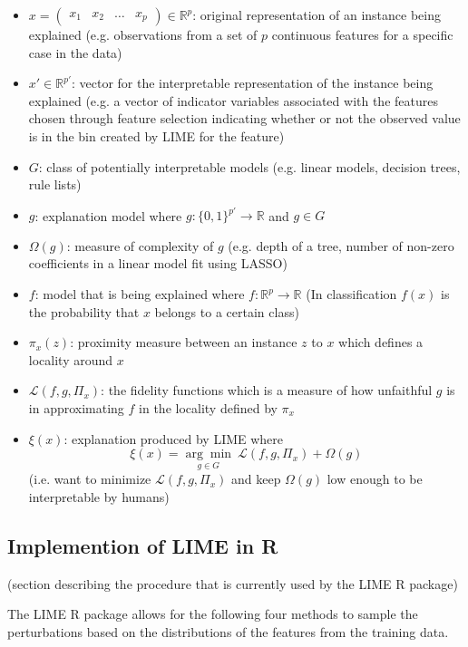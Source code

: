 \documentclass[AMS,STIX2COL]{WileyNJD-v2}
\begin{document}
\begin{itemize}
\item $x=\left(\begin{array}{cccc}x_1 & x_2 & \hdots & x_p\end{array}\right)\in\mathbb{R}^p$: original representation of an instance being explained (e.g. observations from a set of $p$ continuous features for a specific case in the data) %
\item $x'\in\mathbb{R}^{p'}$: vector for the interpretable representation of the instance being explained (e.g. a vector of indicator variables associated with the features chosen through feature selection indicating whether or not the observed value is in the bin created by LIME for the feature)
\item $G$: class of potentially interpretable models (e.g. linear models, decision trees, rule lists)
\item $g$: explanation model where $g:\{0,1\}^{p'}\rightarrow\mathbb{R}$ and $g\in G$
\item $\Omega(g)$: measure of complexity of $g$ (e.g. depth of a tree, number of non-zero coefficients in a linear model fit using LASSO)
\item $f$: model that is being explained where $f:\mathbb{R}^p\rightarrow\mathbb{R}$ (In classification $f(x)$ is the probability that $x$ belongs to a certain class)
\item $\pi_x(z)$: proximity measure between an instance $z$ to $x$ which defines a locality around $x$
\item $\mathcal{L}(f, g, \Pi_x)$: the fidelity functions which is a measure of how unfaithful $g$ is in approximating $f$ in the locality defined by $\pi_x$
\item $\xi(x)$: explanation produced by LIME where
  $$\xi(x)=\underset{g\in G}{\arg\min} \ \mathcal{L}(f, g, \Pi_x)+\Omega(g)$$
(i.e. want to minimize $\mathcal{L}(f, g, \Pi_x)$ and keep $\Omega(g)$ low enough to be interpretable by humans)
\end{itemize}

\subsection{Implemention of LIME in R}

(section describing the procedure that is currently used by the LIME R package)

The LIME R package allows for the following four methods to sample the perturbations based on the distributions of the features from the training data.
\end{document}
